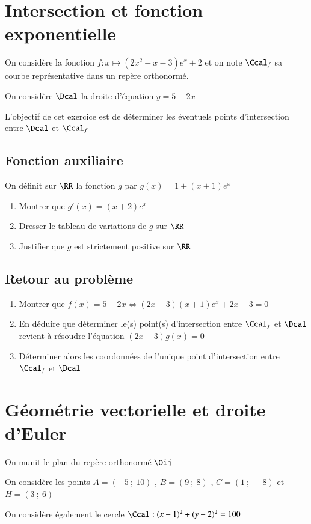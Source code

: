 \documentclass[oneside,12pt]{article}
\begin{document}
\newpage

\section{Intersection et fonction exponentielle}
On considère la fonction $f:x\mapsto (2x^2-x-3)e^x+2$ et on note $\Ccal_f$ sa courbe représentative dans un repère orthonormé.

On considère $\Dcal$ la droite d'équation $y=5-2x$

L'objectif de cet exercice est de déterminer les éventuels points d'intersection entre $\Dcal$ et $\Ccal_f$

\subsection{Fonction auxiliaire}
On définit sur $\RR$ la fonction $g$ par $g(x)=1+(x+1)e^x$
\begin{enumerate}
	\item Montrer que $g'(x)=(x+2)e^x$
	\item Dresser le tableau de variations de $g$ sur $\RR$
	\item Justifier que $g$ est strictement positive sur $\RR$
\end{enumerate}

\subsection{Retour au problème}
\begin{enumerate}
	\item Montrer que $f(x)=5-2x \Longleftrightarrow (2x-3)(x+1)e^x+2x-3=0$
	\item En déduire que déterminer le(s) point(s) d'intersection entre $\Ccal_f$ et $\Dcal$ revient à résoudre l'équation $(2x-3)g(x)=0$
	\item Déterminer alors les coordonnées de l'unique point d'intersection entre $\Ccal_f$ et $\Dcal$
\end{enumerate}



\section{Géométrie vectorielle et droite d'Euler}
On munit le plan du repère orthonormé $\Oij$

On considère les points $A=(-5~;~10)$  , $B=(9~;~8)$ , $C=(1~;~-8)$ et $H=(3~;~6)$

On considère également le cercle $\Ccal:(x-1)^2+(y-2)^2=100$
\end{document}
